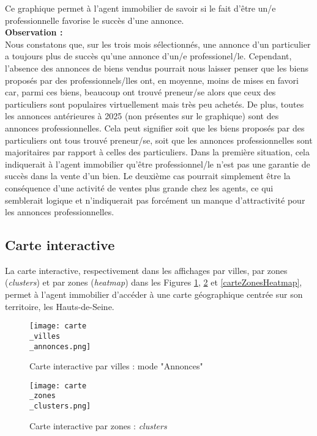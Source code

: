 \documentclass[a4paper, 12pt, twoside]{report}
\begin{document}
			Ce graphique permet à l'agent immobilier de savoir si le fait d'être un/e professionnelle favorise le succès d'une annonce. \\

			{\bf Observation :} \\
	
			Nous constatons que, sur les trois mois sélectionnés, une annonce d'un particulier a toujours plus de succès qu'une annonce d'un/e professionel/le. Cependant, l'absence des annonces de biens vendus pourrait nous laisser penser que les biens proposés par des professionnels/lles ont, en moyenne, moins de mises en favori car, parmi ces biens, beaucoup ont trouvé preneur/se alors que ceux des particuliers sont populaires virtuellement mais très peu achetés. De plus, toutes les annonces antérieures à 2025 (non présentes sur le graphique) sont des annonces professionnelles. Cela peut signifier soit que les biens proposés par des particuliers ont tous trouvé preneur/se, soit que les annonces professionnelles sont majoritaires par rapport à celles des particuliers. Dans la première situation, cela indiquerait à l'agent immobilier qu'être professionnel/le n'est pas une garantie de succès dans la vente d'un bien. Le deuxième cas pourrait simplement être la conséquence d'une activité de ventes plus grande chez les agents, ce qui semblerait logique et n'indiquerait pas forcément un manque d'attractivité pour les annonces professionnelles. \\

		\subsection{Carte interactive}
		
		La carte interactive, respectivement dans les affichages par villes, par zones ({\it clusters}) et par zones ({\it heatmap}) dans les Figures \ref{carteVillesAnnonces}, \ref{carteZonesClusters} et \ref{carteZonesHeatmap}, permet à l'agent immobilier d'accéder à une carte géographique centrée sur son territoire, les Hauts-de-Seine. \\

		\begin{figure}[h]
			\centering
			\texttt{[image: carte\\\_villes\\\_annonces.png]}
			\caption{Carte interactive par villes : mode "Annonces"}
			\label{carteVillesAnnonces}
		\end{figure}	

		\begin{figure}[h]
			\centering
			\texttt{[image: carte\\\_zones\\\_clusters.png]}
			\caption{Carte interactive par zones : {\it clusters}}
			\label{carteZonesClusters}
		\end{figure}	
\end{document}
